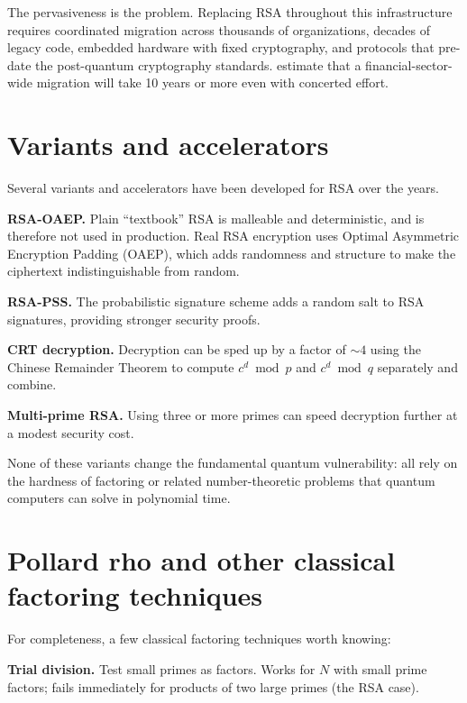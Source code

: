The pervasiveness is the problem. Replacing RSA throughout this infrastructure requires coordinated migration across thousands of organizations, decades of legacy code, embedded hardware with fixed cryptography, and protocols that pre-date the post-quantum cryptography standards. \citet{auer_quantum_2024} estimate that a financial-sector-wide migration will take 10 years or more even with concerted effort.

\section{Variants and accelerators}

Several variants and accelerators have been developed for RSA over the years.

\textbf{RSA-OAEP.} Plain ``textbook'' RSA is malleable and deterministic, and is therefore not used in production. Real RSA encryption uses Optimal Asymmetric Encryption Padding (OAEP), which adds randomness and structure to make the ciphertext indistinguishable from random.

\textbf{RSA-PSS.} The probabilistic signature scheme adds a random salt to RSA signatures, providing stronger security proofs.

\textbf{CRT decryption.} Decryption can be sped up by a factor of $\sim 4$ using the Chinese Remainder Theorem to compute $c^d \bmod p$ and $c^d \bmod q$ separately and combine.

\textbf{Multi-prime RSA.} Using three or more primes can speed decryption further at a modest security cost.

None of these variants change the fundamental quantum vulnerability: all rely on the hardness of factoring or related number-theoretic problems that quantum computers can solve in polynomial time.

\section{Pollard rho and other classical factoring techniques}

For completeness, a few classical factoring techniques worth knowing:

\textbf{Trial division.} Test small primes as factors. Works for $N$ with small prime factors; fails immediately for products of two large primes (the RSA case).

